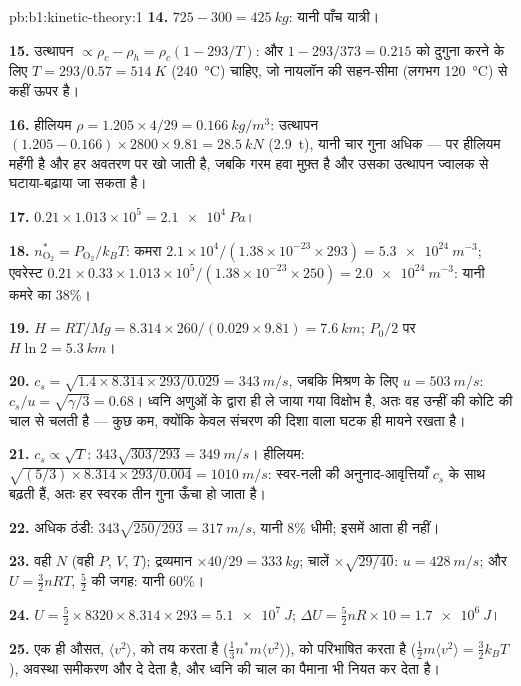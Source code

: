 \begin{solution}{pb:b1:kinetic-theory:1}
\textbf{14.} $725 - 300 = \qty{425}{kg}$: यानी पाँच यात्री।

\textbf{15.} उत्थापन $\propto \rho_c - \rho_h = \rho_c(1 - 293/T)$: और
$1 - 293/373 = 0.215$ को दुगुना करने के लिए $T = 293/0.57 = \qty{514}{K}$ (\qty{240}{\degreeCelsius}) चाहिए,
जो नायलॉन की सहन-सीमा (लगभग \qty{120}{\degreeCelsius}) से कहीं ऊपर है।

\textbf{16.} हीलियम $\rho = 1.205 \times 4/29 = \qty{0.166}{kg/m^3}$: उत्थापन
$(1.205 - 0.166) \times 2800 \times 9.81 = \qty{28.5}{kN}$ (\qty{2.9}{t}), यानी चार
गुना अधिक --- पर हीलियम महँगी है और हर अवतरण पर खो जाती है, जबकि गरम हवा
मुफ़्त है और उसका उत्थापन ज्वालक से घटाया-बढ़ाया जा सकता है।

\textbf{17.} $0.21 \times 1.013\times10^5 = \qty{2.1e4}{Pa}$।

\textbf{18.} $n^*_{\mathrm{O}_2} = P_{\mathrm{O}_2}/k_BT$: कमरा $2.1\times10^4/
(1.38\times10^{-23} \times 293) = \qty{5.3e24}{m^{-3}}$; एवरेस्ट $0.21 \times 0.33
\times 1.013\times10^5/(1.38\times10^{-23} \times 250) = \qty{2.0e24}{m^{-3}}$:
यानी कमरे का $38\%$।

\textbf{19.} $H = RT/Mg = 8.314 \times 260/(0.029 \times 9.81) = \qty{7.6}{km}$;
$P_0/2$ पर $H\ln 2 = \qty{5.3}{km}$।

\textbf{20.} $c_s = \sqrt{1.4 \times 8.314 \times 293/0.029} = \qty{343}{m/s}$,
जबकि मिश्रण के लिए $u = \qty{503}{m/s}$: $c_s/u = \sqrt{\gamma/3} = 0.68$।
ध्वनि अणुओं के द्वारा ही ले जाया गया विक्षोभ है, अतः वह उन्हीं की कोटि की
चाल से चलती है --- कुछ कम, क्योंकि केवल संचरण की दिशा वाला घटक ही मायने
रखता है।

\textbf{21.} $c_s \propto \sqrt T$: $343\sqrt{303/293} = \qty{349}{m/s}$।
हीलियम: $\sqrt{(5/3) \times 8.314 \times 293/0.004} = \qty{1010}{m/s}$: स्वर-नली
की अनुनाद-आवृत्तियाँ $c_s$ के साथ बढ़ती हैं, अतः हर स्वरक तीन गुना ऊँचा हो
जाता है।

\textbf{22.} अधिक ठंडी: $343\sqrt{250/293} = \qty{317}{m/s}$, यानी $8\%$ धीमी;
 इसमें आता ही नहीं।

\textbf{23.} वही $N$ (वही $P$, $V$, $T$); द्रव्यमान $\times 40/29 = \qty{333}{kg}$;
चालें $\times\sqrt{29/40}$: $u = \qty{428}{m/s}$; और $U = \tfrac32 nRT$, $\tfrac52$ की
जगह: यानी $60\%$।

\textbf{24.} $U = \tfrac52 \times 8320 \times 8.314 \times 293 = \qty{5.1e7}{J}$;
$\Delta U = \tfrac52 nR \times 10 = \qty{1.7e6}{J}$।

\textbf{25.} एक ही औसत, $\langle v^2\rangle$,  को तय करता है
($\tfrac13 n^*m\langle v^2\rangle$),  को परिभाषित करता है
($\tfrac12 m\langle v^2\rangle = \tfrac32 k_BT$), अवस्था समीकरण और  दे देता है, और ध्वनि की चाल का पैमाना भी नियत कर देता है।
\end{solution}
